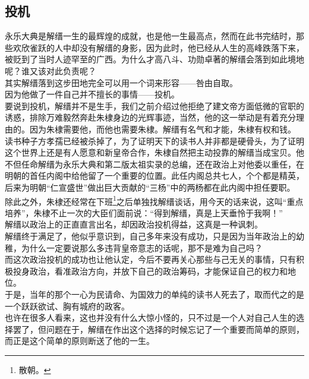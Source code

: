 \begin{multicols}{\theparacolNo}
\subsection{投机}
永乐大典是解缙一生的最辉煌的成就，也是他一生最高点，然而在此书完结时，那些欢欣雀跃的人中却没有解缙的身影，因为此时，他已经从人生的高峰跌落下来，被贬到了当时人迹罕至的广西。为什么才高八斗、功勋卓著的解缙会落到如此境地呢？谁又该对此负责呢？\\

其实解缙落到这步田地完全可以用一个词来形容——咎由自取。\\

因为他做了一件自己并不擅长的事情——投机。\\

要说到投机，解缙并不是生手，我们之前介绍过他拒绝了建文帝方面低微的官职的诱惑，排除万难毅然奔赴朱棣身边的光辉事迹，当然，他的这一举动是有着充分理由的。因为朱棣需要他，而他也需要朱棣。解缙有名气和才能，朱棣有权和钱。\\

读书种子方孝孺已经被杀掉了，为了证明天下的读书人并非都是硬骨头，为了证明这个世界上还是有人愿意和新皇帝合作，朱棣自然把主动投靠的解缙当成宝贝。他不但任命解缙为永乐大典和第二版太祖实录的总编，还在政治上对他委以重任，在明朝的首任内阁中给他留了一个重要的位置。此任内阁总共七人，个个都是精英，后来为明朝“仁宣盛世”做出巨大贡献的“三杨”中的两杨都在此内阁中担任要职。\\

除此之外，朱棣还经常在下班\footnote{散朝。}之后单独找解缙谈话，用今天的话来说，这叫“重点培养”，朱棣不止一次的大臣们面前说：“得到解缙，真是上天垂怜于我啊！”\\

解缙以政治上的正直直言出名，却因政治投机得益，这真是一种讽刺。\\

解缙终于满足了，他似乎意识到，自己多年来没有成功，只是因为当年政治上的幼稚，为什么一定要说那么多违背皇帝意志的话呢，那不是难为自己吗？\\

而这次政治投机的成功也让他认定，今后不要再关心那些与己无关的事情，只有积极投身政治，看准政治方向，并放下自己的政治筹码，才能保证自己的权力和地位。\\

于是，当年的那个一心为民请命、为国效力的单纯的读书人死去了，取而代之的是一个跃跃欲试、胸有城府的政客。\\

也许在很多人看来，这也并没有什么大惊小怪的，只不过是一个人对自己人生的选择罢了，但问题在于，解缙在作出这个选择的时候忘记了一个重要而简单的原则，而正是这个简单的原则断送了他的一生。\\


\end{multicols}
